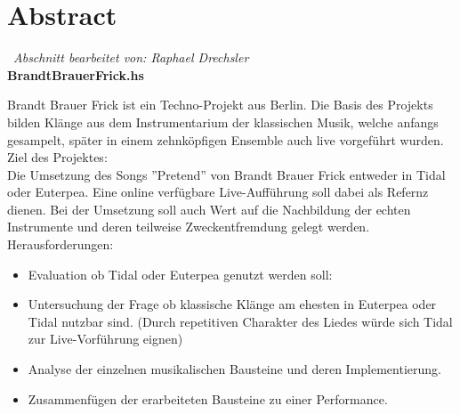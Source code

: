 \documentclass[
10pt, %
a4paper, %
oneside, %
headinclude,footinclude, %
BCOR5mm, %
]{scrartcl}
\begin{document}





\newpage %

\section{Abstract}\
\textit{Abschnitt bearbeitet von: Raphael Drechsler}\\

\noindent \textbf{BrandtBrauerFrick.hs}

\noindent Brandt Brauer Frick ist ein Techno-Projekt aus Berlin.
Die Basis des Projekts bilden Klänge aus dem Instrumentarium der
klassischen Musik, welche anfangs gesampelt, später in einem zehnköpfigen
Ensemble auch live vorgeführt wurden.\cite{Wiki}\\ 

\noindent Ziel des Projektes:\\
Die Umsetzung des Songs ''Pretend'' von Brandt Brauer Frick entweder in
Tidal oder Euterpea. Eine online verfügbare Live-Aufführung \cite{YT1} soll dabei als Refernz dienen. Bei der Umsetzung soll auch Wert auf die Nachbildung der echten Instrumente und deren teilweise Zweckentfremdung gelegt werden.\\

\noindent Herausforderungen:
\begin{itemize}
	\itemsep0em
	\item Evaluation ob Tidal oder Euterpea genutzt werden soll:
	\item Untersuchung der Frage ob klassische Klänge am ehesten in Euterpea oder
	Tidal nutzbar sind. (Durch repetitiven Charakter des Liedes würde sich Tidal zur
	Live-Vorführung eignen)
	\item Analyse der einzelnen musikalischen Bausteine und deren Implementierung.
	\item Zusammenfügen der erarbeiteten Bausteine zu einer Performance.
\end{itemize}
\end{document}
